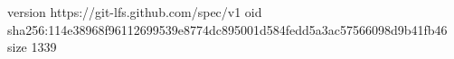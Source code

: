 version https://git-lfs.github.com/spec/v1
oid sha256:114e38968f96112699539e8774dc895001d584fedd5a3ac57566098d9b41fb46
size 1339
